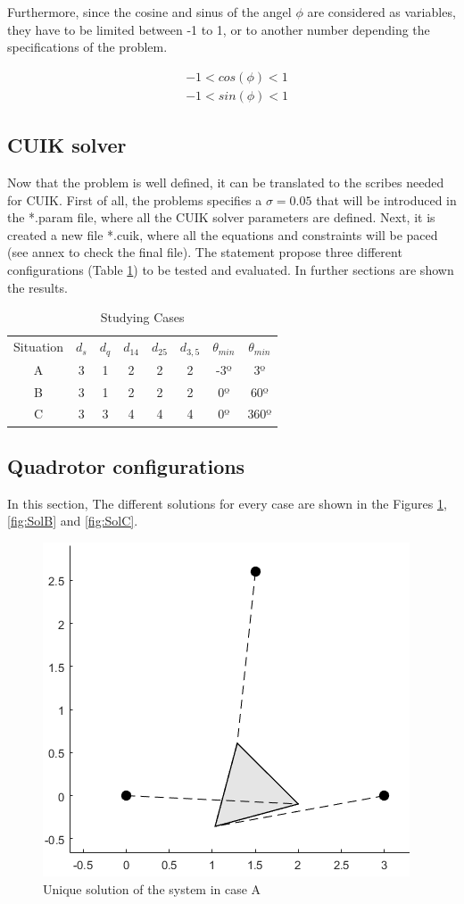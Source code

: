 \documentclass[paper=a4, fontsize=11pt]{scrartcl} %
\begin{document}
Furthermore, since the cosine and sinus of the angel $\phi$ are considered as variables, they have to be limited between -1 to 1, or to another number depending the specifications of the problem.

\begin{align}
&-1<cos(\phi)<1 \\
&-1<sin(\phi)<1 
\end{align}

\subsection*{CUIK solver}
Now that the problem is well defined, it can be translated to the scribes needed for CUIK. First of all, the problems specifies a $\sigma=0.05$ that will be introduced in the *.param file, where all the CUIK solver parameters are defined. Next, it is created a new file *.cuik, where all the equations and constraints will be paced (see annex to check the final file). The statement propose three different configurations (Table \ref{tab:cases}) to be tested and evaluated. In further sections are shown the results.

\begin{table}[ht]
\begin{center}
	\begin{tabular}{ c c c c c c c c  }
 			Situation & $d_s$ & $d_q$ & $d_{14}$ & $d_{25}$ & $d_{3,5}$ & $\theta_{min}$ & $\theta_{min}$ \\
 			A & 3 & 1 & 2 & 2 & 2 & -3º & 3º \\
 			B & 3 & 1 & 2 & 2 & 2 & 0º & 60º \\
            C & 3 & 3 & 4 & 4 & 4 & 0º & 360º \\
	\end{tabular}
    \caption{Studying Cases}
    \label{tab:cases}
\end{center}
\end{table}

\subsection*{Quadrotor configurations}
In this section, The different solutions for every case are shown in the Figures \ref{fig:SolA}, \ref{fig:SolB} and \ref{fig:SolC}.

\begin{figure}[H]
	\begin{center}
		\includegraphics[width=0.5\linewidth]{SolA.png} 
	\caption{Unique solution of the system in case A}
	\label{fig:SolA}
	\end{center}
\end{figure}
\end{document}
